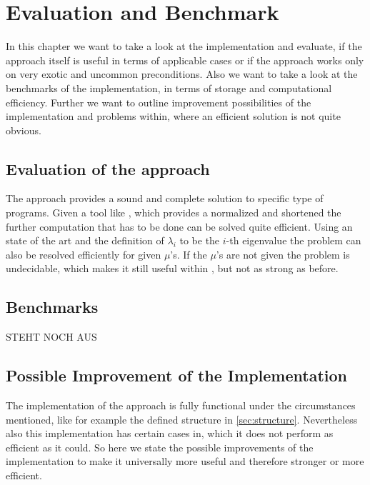 \chapter{Evaluation and Benchmark}
\label{chapter:eval}
In this chapter we want to take a look at the implementation and evaluate, if the approach itself is useful in terms of applicable cases or if the approach works only on very exotic and uncommon preconditions. \newline
Also we want to take a look at the benchmarks of the implementation, in terms of storage and computational efficiency.\newline
Further we want to outline improvement possibilities of the implementation and problems within, where an efficient solution is not quite obvious.

\section{Evaluation of the approach}
The approach provides a sound and complete solution to specific type of programs. Given a tool like \aprove, which provides a normalized and shortened \its the further computation that has to be done can be solved quite efficient. Using an state of the art \solver and the definition of $\lambda_i$ to be the $i$-th eigenvalue the problem can also be resolved efficiently for given $\mu$'s. If the $\mu$'s are not given the problem is undecidable, which makes it still useful within \aprove, but not as strong as before. \newline

\section{Benchmarks}


STEHT NOCH AUS


\section{Possible Improvement of the Implementation}
The implementation of the approach is fully functional under the circumstances mentioned, like for example the defined structure in \autoref{sec:structure}. Nevertheless also this implementation has certain cases in, which it does not perform as efficient as it could.
So here we state the possible improvements of the implementation to make it universally more useful and therefore stronger or more efficient.
